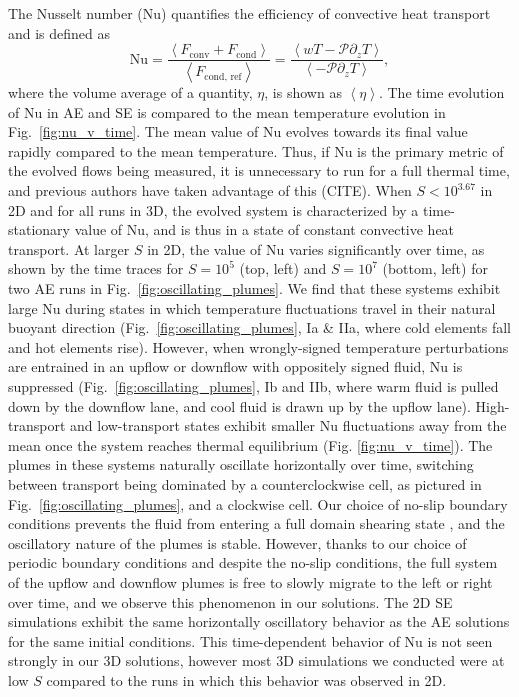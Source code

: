 \documentclass[aps, pre, onecolumn, nofootinbib, notitlepage, groupedaddress, amsfonts, amssymb, amsmath, longbibliography]{revtex4-1}
\newcommand{\angles}[1]{\ensuremath{\left\langle #1 \right\rangle}}
\begin{document}
The Nusselt number (Nu) quantifies the efficiency of convective heat transport
and is defined as
\begin{equation}
\text{Nu} = \frac{\angles{F_{\text{conv}} + F_{\text{cond}}}}{\angles{F_{\text{cond, ref}}}}
 = \frac{\angles{wT - \mathcal{P}\partial_z T}}{\angles{- \mathcal{P} \partial_z T}},
\end{equation}
where the volume average of a quantity, $\eta$, is shown as $\angles{\eta}$.
The time evolution of Nu in AE and SE is compared to the mean temperature evolution
in Fig.~\ref{fig:nu_v_time}. The mean value of Nu evolves towards its final value
rapidly compared to the mean temperature. Thus, if Nu is the primary metric of 
the evolved flows being measured, it is unnecessary to run for a full thermal
time, and previous authors have taken advantage of this (CITE).
When $S < 10^{3.67}$ in 2D and for all runs in 3D, 
the evolved system is characterized by a time-stationary value of Nu, and is thus
in a state of constant convective heat transport.
At larger $S$ in 2D, the value of Nu varies significantly over time,
as shown by the time traces for $S = 10^5$ (top, left) and $S = 10^7$ (bottom, left) for two
AE runs in Fig.~\ref{fig:oscillating_plumes}. We find that these systems exhibit
large Nu during
states in which temperature fluctuations travel in their natural buoyant
direction (Fig.~\ref{fig:oscillating_plumes}, Ia \& IIa, where cold elements fall and hot elements rise).
However, when wrongly-signed temperature perturbations are entrained in an upflow or downflow
with oppositely signed fluid, Nu is suppressed (Fig.~\ref{fig:oscillating_plumes}, Ib and IIb, 
where warm fluid is pulled down by the downflow
lane, and cool fluid is drawn up by the upflow lane). High-transport and 
low-transport states exhibit smaller Nu fluctuations away from the 
mean once the system reaches thermal equilibrium (Fig. \ref{fig:nu_v_time}).
The plumes in these
systems naturally oscillate horizontally over time, switching between transport being dominated
by a counterclockwise cell, as pictured in Fig.~\ref{fig:oscillating_plumes}, and
a clockwise cell. Our choice of no-slip
boundary conditions prevents the fluid from entering a full domain shearing state 
\cite{goluskin&all2014}, and the
oscillatory nature of the plumes is stable. However, thanks to our choice of periodic
boundary conditions and despite the no-slip conditions, the full system of the
upflow and downflow plumes is free to slowly migrate to the left or right over time,
and we observe this phenomenon in our solutions.
The 2D SE simulations exhibit the same horizontally
oscillatory behavior as the AE solutions for the same initial conditions. 
This time-dependent behavior of Nu is not seen strongly in our 3D solutions,
however most 3D simulations we conducted were at low $S$ compared to the runs in
which this behavior was observed in 2D.
\end{document}
